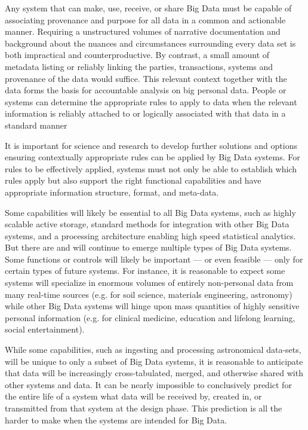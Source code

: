 Any system that can make, use, receive, or share Big Data must be capable of associating provenance and purpose for all data in a common and actionable manner.
Requiring a unstructured volumes of narrative documentation and background about the nuances and circumstances surrounding every data set is both impractical and counterproductive.
By contrast, a small amount of metadata listing or reliably linking the parties, transactions, systems and provenance of the data would suffice.
This relevant context together with the data forms the basis for accountable analysis on big personal data.  People or systems can determine the appropriate rules to apply to data when the relevant information is reliably attached to or logically associated with that data in a standard manner 

It is important for science and research to develop further solutions and options ensuring contextually appropriate rules can be applied by Big Data systems.
For rules to be effectively applied, systems must not only be able to establish which rules apply but also support the right functional capabilities and have appropriate information structure, format, and meta-data.

Some capabilities will likely be essential to all Big Data systems, such as highly scalable active storage, standard methods for integration with other Big Data systems, and a processing architecture enabling high speed statistical analytics.
But there are and will continue to emerge multiple types of Big Data systems.
Some functions or controls will likely be important --- or even feasible --- only for certain types of future systems.
For instance, it is reasonable to expect some systems will specialize in enormous volumes of entirely non-personal data from many real-time sources (e.g. for soil science, materials engineering, astronomy) while other Big Data systems will hinge upon mass quantities of highly sensitive personal information (e.g. for clinical medicine, education and lifelong learning, social entertainment).

While some capabilities, such as ingesting and processing astronomical data-sets, will be unique to only a subset of Big Data systems, it is reasonable to anticipate that data will be increasingly cross-tabulated, merged, and otherwise shared with other systems and data.
It can be nearly impossible to conclusively predict for the entire life of a system what data will be received by, created in, or transmitted from that system at the design phase.
This prediction is all the harder to make when the systems are intended for Big Data.

